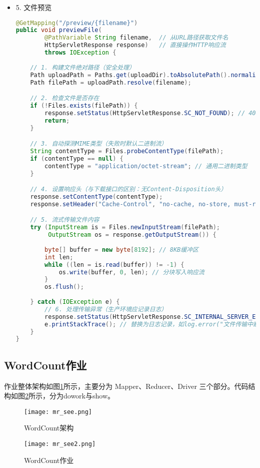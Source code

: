 \documentclass[bachelor]{thesis-uestc}
\begin{document}
\begin{itemize}
\item 5. 文件预览
\begin{lstlisting}[language=Java]
@GetMapping("/preview/{filename}")
public void previewFile(
        @PathVariable String filename,  // 从URL路径获取文件名
        HttpServletResponse response)   // 直接操作HTTP响应流
        throws IOException {
    
    // 1. 构建文件绝对路径（安全处理）
    Path uploadPath = Paths.get(uploadDir).toAbsolutePath().normalize();
    Path filePath = uploadPath.resolve(filename);

    // 2. 检查文件是否存在
    if (!Files.exists(filePath)) {
        response.setStatus(HttpServletResponse.SC_NOT_FOUND); // 404
        return;
    }

    // 3. 自动探测MIME类型（失败时默认二进制流）
    String contentType = Files.probeContentType(filePath);
    if (contentType == null) {
        contentType = "application/octet-stream"; // 通用二进制类型
    }

    // 4. 设置响应头（与下载接口的区别：无Content-Disposition头）
    response.setContentType(contentType);
    response.setHeader("Cache-Control", "no-cache, no-store, must-revalidate"); // 禁用缓存

    // 5. 流式传输文件内容
    try (InputStream is = Files.newInputStream(filePath);
         OutputStream os = response.getOutputStream()) {
        
        byte[] buffer = new byte[8192]; // 8KB缓冲区
        int len;
        while ((len = is.read(buffer)) != -1) {
            os.write(buffer, 0, len); // 分块写入响应流
        }
        os.flush();
        
    } catch (IOException e) {
        // 6. 处理传输异常（生产环境应记录日志）
        response.setStatus(HttpServletResponse.SC_INTERNAL_SERVER_ERROR); // 500
        e.printStackTrace(); // 替换为日志记录，如log.error("文件传输中断", e);
    }
}
\end{lstlisting}
\end{itemize}

\subsection{WordCount作业}
作业整体架构如图\ref{mrs1}所示，主要分为 Mapper、Reducer、Driver 三个部分。代码结构如图\ref{mrs2}所示，分为dowork与show。
\begin{figure}[htbp]
    \centering
    \texttt{[image: mr\_see.png]}
    \caption{WordCount架构}
    \label{mrs1}
\end{figure}
\begin{figure}[htbp]
    \centering
    \texttt{[image: mr\_see2.png]}
    \caption{WordCount作业}
    \label{mrs2}
\end{figure}
\end{document}
